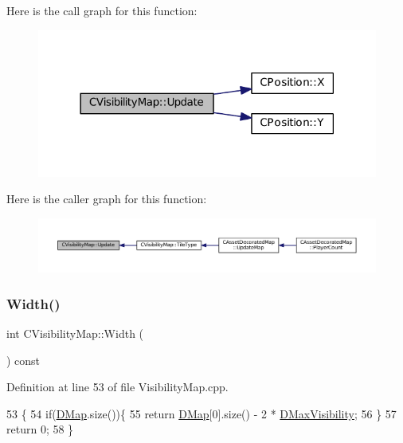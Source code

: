 Here is the call graph for this function\+:
\nopagebreak
\begin{figure}[H]
\begin{center}
\leavevmode
\includegraphics[width=318pt]{classCVisibilityMap_a5ca9902ef0bc2714617719800e20aa19_cgraph}
\end{center}
\end{figure}
Here is the caller graph for this function\+:
\nopagebreak
\begin{figure}[H]
\begin{center}
\leavevmode
\includegraphics[width=350pt]{classCVisibilityMap_a5ca9902ef0bc2714617719800e20aa19_icgraph}
\end{center}
\end{figure}
\hypertarget{classCVisibilityMap_ae916b942ca0d25d93eb8ecde5f08aef3}{}\label{classCVisibilityMap_ae916b942ca0d25d93eb8ecde5f08aef3} 
\subsubsection{\texorpdfstring{Width()}{Width()}}
{\footnotesize\ttfamily int C\+Visibility\+Map\+::\+Width (\begin{DoxyParamCaption}{ }\end{DoxyParamCaption}) const}



Definition at line 53 of file Visibility\+Map.\+cpp.


\begin{DoxyCode}
53                                \{
54     \textcolor{keywordflow}{if}(\hyperlink{classCVisibilityMap_ad217bc34f7a50dd357a3eeeb69cfdd85}{DMap}.size())\{
55         \textcolor{keywordflow}{return} \hyperlink{classCVisibilityMap_ad217bc34f7a50dd357a3eeeb69cfdd85}{DMap}[0].size() - 2 * \hyperlink{classCVisibilityMap_ac8f71b9541c903fce0294d75daa1bbb1}{DMaxVisibility};
56     \}
57     \textcolor{keywordflow}{return} 0;
58 \}
\end{DoxyCode}


